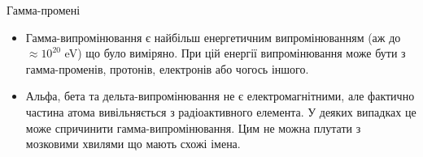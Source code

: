 {\Large Гамма-промені}
\begin{itemize}

\item Гамма-випромінювання є найбільш енергетичним випромінюванням (аж до $\approx 10^{20}$ eV) що було виміряно. При цій енергії випромінювання може бути з гамма-променів, протонів, електронів або чогось іншого.

\item Альфа, бета та дельта-випромінювання не є електромагнітними, але фактично частина атома вивільняється з радіоактивного елемента. У деяких випадках це може спричинити гамма-випромінювання. Цим не можна плутати з мозковими хвилями що мають схожі імена.

\end{itemize}
